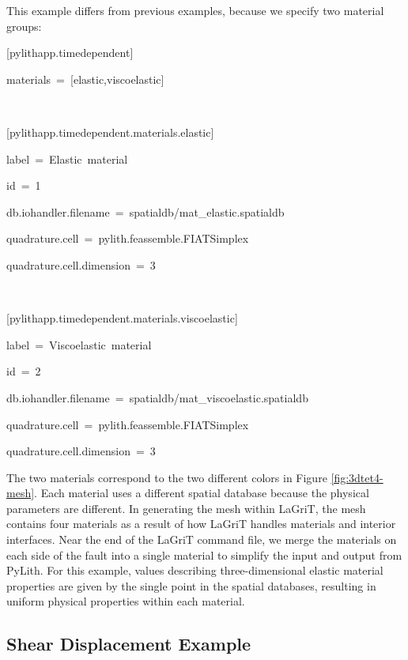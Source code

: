 This example differs from previous examples, because we specify two
material groups:
\begin{lyxcode}
{[}pylithapp.timedependent{]}

materials~=~{[}elastic,viscoelastic{]}

~

{[}pylithapp.timedependent.materials.elastic{]}

label~=~Elastic~material

id~=~1

db.iohandler.filename~=~spatialdb/mat\_elastic.spatialdb

quadrature.cell~=~pylith.feassemble.FIATSimplex

quadrature.cell.dimension~=~3

~

{[}pylithapp.timedependent.materials.viscoelastic{]}

label~=~Viscoelastic~material

id~=~2

db.iohandler.filename~=~spatialdb/mat\_viscoelastic.spatialdb

quadrature.cell~=~pylith.feassemble.FIATSimplex

quadrature.cell.dimension~=~3




\end{lyxcode}
The two materials correspond to the two different colors in Figure
\vref{fig:3dtet4-mesh}. Each material uses a different spatial database
because the physical parameters are different. In generating the mesh
within LaGriT, the mesh contains four materials as a result of how
LaGriT handles materials and interior interfaces. Near the end of
the LaGriT command file, we merge the materials on each side of the
fault into a single material to simplify the input and output from
PyLith. For this example, values describing three-dimensional elastic
material properties are given by the single point in the spatial databases,
resulting in uniform physical properties within each material.


\subsection{Shear Displacement Example}

